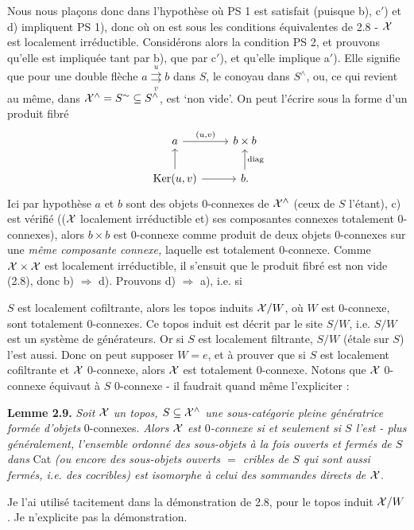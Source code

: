Nous nous plaçons donc dans l'hypothèse où PS 1 est satisfait (puisque b), c$'$) et d) impliquent PS 1), donc où on est sous les conditions équivalentes de 2.8 - $\mathcal{X}$ est localement irréductible. Considérons alors la condition PS 2, et prouvons qu'elle est impliquée tant par b), que par c$'$), et qu'elle implique a$'$). Elle signifie que pour une double flèche $a\overset{u}{\underset{v}{\rightrightarrows}}b$ dans $S$, le conoyau dans $S^\wedge$, ou, ce qui revient au même, dans $\mathcal{X}^\wedge=S^\sim\subseteq S^\wedge$, est `non vide'. On peut l'écrire sous la forme d'un produit fibré
\[
\begin{tikzcd}
a \arrow[r, "{\scriptstyle (u,v)}"] & b\times b \\
\operatorname{Ker}(u,v) \arrow[u] \arrow[r] & b. \arrow[u, "\mathrm{diag}"']
\end{tikzcd}
\]
Ici par hypothèse $a$ et $b$ sont des objets 0-connexes de $\mathcal{X}^\wedge$ (ceux de $S$ l'étant), c) est vérifié (($\mathcal{X}$ localement irréductible et) ses composantes connexes totalement 0-connexes), alors $b\times b$ est 0-connexe comme produit de deux objets 0-connexes sur une \textit{même composante connexe,} laquelle est totalement 0-connexe. Comme $\mathcal{X}\times\mathcal{X}$ est localement irréductible, il s'ensuit que le produit fibré est non vide (2.8), donc b) $\Longrightarrow$ d). Prouvons d) $\Longrightarrow$ a), i.e. si

$S$ est localement cofiltrante, alors les topos induits $\mathcal{X}/W$, où $W$ est 0-connexe, sont totalement 0-connexes. Ce topos induit est décrit par le site $S/W$, i.e. $S/W$ est un système de générateurs. Or si $S$ est localement filtrante, $S/W$ (étale sur $S$) l'est aussi. Donc on peut supposer $W=e$, et à prouver que si $S$ est localement cofiltrante et $\mathcal{X}$ 0-connexe, alors $\mathcal{X}$ est totalement 0-connexe. Notons que $\mathcal{X}$ 0-connexe équivaut à $S$ 0-connexe - il faudrait quand même l'expliciter :

\textbf{Lemme 2.9.} \textit{Soit $\mathcal{X}$ un topos, $S\subseteq\mathcal{X}^\wedge$ une sous-catégorie pleine génératrice formée d'objets} 0-connexes. \textit{Alors $\mathcal{X}$ est $0$-connexe si et seulement si $S$ l'est - plus généralement, l'ensemble ordonné des sous-objets à la fois ouverts et fermés de $S$ dans} Cat \textit{(ou encore des
sous-objets ouverts $=$ cribles de $S$ qui sont aussi fermés, i.e. des cocribles) est isomorphe à celui des sommandes directs de $\mathcal{X}$.}

Je l'ai utilisé tacitement dans la démonstration de 2.8, pour le topos induit $\mathcal{X}/W$. Je n'explicite pas la démonstration.

